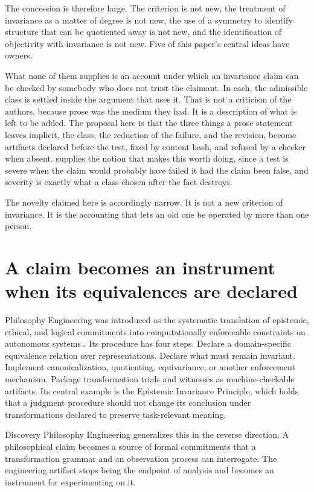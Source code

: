 \documentclass[11pt]{article}
\theoremstyle{remark}
\begin{document}
The concession is therefore large. The criterion is not new, the treatment of
invariance as a matter of degree is not new, the use of a symmetry to identify
structure that can be quotiented away is not new, and the identification of
objectivity with invariance is not new. Five of this paper's central ideas have
owners.

What none of them supplies is an account under which an invariance claim can be
checked by somebody who does not trust the claimant. In each, the admissible class
is settled inside the argument that uses it. That is not a criticism of the
authors, because prose was the medium they had. It is a description of what is left
to be added. The proposal here is that the three things a prose statement leaves
implicit, the class, the reduction of the failure, and the revision, become
artifacts declared before the test, fixed by content hash, and refused by a checker
when absent. \citet{mayo2018} supplies the notion that makes this worth doing,
since a test is severe when the claim would probably have failed it had the claim
been false, and severity is exactly what a class chosen after the fact destroys.

The novelty claimed here is accordingly narrow. It is not a new criterion of
invariance. It is the accounting that lets an old one be operated by more than one
person.

\section{A claim becomes an instrument when its equivalences are declared}

Philosophy Engineering was introduced as the systematic translation of epistemic,
ethical, and logical commitments into computationally enforceable constraints on
autonomous systems \citep{bond2026pe}. Its procedure has four steps. Declare a
domain-specific equivalence relation over representations. Declare what must remain
invariant. Implement canonicalization, quotienting, equivariance, or another
enforcement mechanism. Package transformation trials and witnesses as
machine-checkable artifacts. Its central example is the Epistemic Invariance
Principle, which holds that a judgment procedure should not change its conclusion
under transformations declared to preserve task-relevant meaning.

Discovery Philosophy Engineering generalizes this in the reverse direction. A
philosophical claim becomes a source of formal commitments that a transformation
grammar and an observation process can interrogate. The engineering artifact stops
being the endpoint of analysis and becomes an instrument for experimenting on it.
\end{document}
